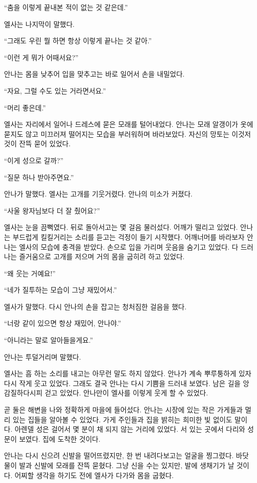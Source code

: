 ``춤을 이렇게 끝내본 적이 없는 것 같은데.''

엘사는 나지막이 말했다.

``그래도 우린 뭘 하면 항상 이렇게 끝나는 것 같아.''

``이런 게 뭐가 어때서요?''

안나는 몸을 낮추어 입을 맞추고는 바로 일어서 손을 내밀었다.

``자요, 그럴 수도 있는 거라면서요.''

``머리 좋은데.''

엘사는 자리에서 일어나 드레스에 묻은 모래를 털어내었다. 안나는 모래 알갱이가 옷에 묻지도 않고 미끄러져 떨어지는 모습을 부러워하며 바라보았다. 자신의 망토는 이것저것이 잔뜩 묻어 있었다.

``이게 성으로 갈까?''

``질문 하나 받아주면요.''

안나가 말했다. 엘사는 고개를 기웃거렸다. 안나의 미소가 커졌다.

``사울 왕자님보다 더 잘 췄어요?''

엘사는 눈을 끔뻑였다. 뒤로 돌아서고는 몇 걸음 물러섰다. 어깨가 떨리고 있었다. 안나는 부드럽게 킬킬거리는 소리를 듣고는 걱정이 들기 시작했다. 어깨너머를 바라보자 안나는 엘사의 모습에 충격을 받았다. 손으로 입을 가리며 웃음을 숨기고 있었다. 다 드러나는 즐거움으로 고개를 저으며 거의 몸을 굽히려 하고 있었다.

``왜 웃는 거예요!''

``네가 질투하는 모습이 그냥 재밌어서.''

엘사가 말했다. 다시 안나의 손을 잡고는 청처짐한 걸음을 했다.

``너랑 같이 있으면 항상 재밌어, 안나야.''

``아니라는 말로 알아들을게요.''

안나는 투덜거리며 말했다.

엘사는 흠 하는 소리를 내고는 아무런 말도 하지 않았다. 안나가 계속 뿌루퉁하게 있자 다시 작게 웃고 있었다. 그래도 결국 안나는 다시 기쁨을 드러내 보였다. 남은 길을 앙감질하다시피 걷고 있었다. 안나만이 엘사를 이렇게 웃게 할 수 있었다.

곧 둘은 해변을 나와 정확하게 마을에 들어섰다. 안나는 시장에 있는 작은 가게들과 멀리 있는 집들을 알아볼 수 있었다. 가게 주인들과 집을 밝히는 희미한 빛 없이도 말이다. 아렌델 성은 걸어서 몇 분이 채 되지 않는 거리에 있었다. 서 있는 곳에서 다리와 성문이 보였다. 집에 도착한 것이다.

안나는 다시 신으려 신발을 떨어뜨렸지만, 한 번 내려다보고는 얼굴을 찡그렸다. 바닷물이 발과 신발에 모래를 잔뜩 묻혔다. 그냥 신을 수는 있지만, 발에 생채기가 날 것이다. 어찌할 생각을 하기도 전에 엘사가 다가와 몸을 굽혔다.


